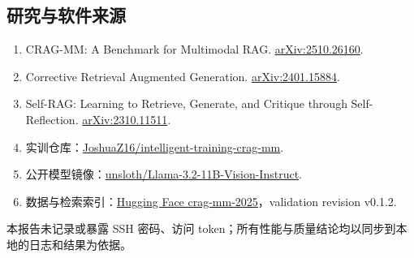\documentclass[11pt,a4paper]{ctexart}
\begin{document}
\subsection{研究与软件来源}
\small
\begin{enumerate}
  \item CRAG-MM: A Benchmark for Multimodal RAG. \href{https://arxiv.org/abs/2510.26160}{arXiv:2510.26160}.
  \item Corrective Retrieval Augmented Generation. \href{https://arxiv.org/abs/2401.15884}{arXiv:2401.15884}.
  \item Self-RAG: Learning to Retrieve, Generate, and Critique through Self-Reflection. \href{https://arxiv.org/abs/2310.11511}{arXiv:2310.11511}.
  \item 实训仓库：\href{https://github.com/JoshuaZ16/intelligent-training-crag-mm}{JoshuaZ16/intelligent-training-crag-mm}.
  \item 公开模型镜像：\href{https://huggingface.co/unsloth/Llama-3.2-11B-Vision-Instruct}{unsloth/Llama-3.2-11B-Vision-Instruct}.
  \item 数据与检索索引：\href{https://huggingface.co/crag-mm-2025}{Hugging Face crag-mm-2025}，validation revision v0.1.2.
\end{enumerate}

\begin{riskbox}
本报告未记录或暴露 SSH 密码、访问 token；所有性能与质量结论均以同步到本地的日志和结果为依据。
\end{riskbox}
\end{document}
